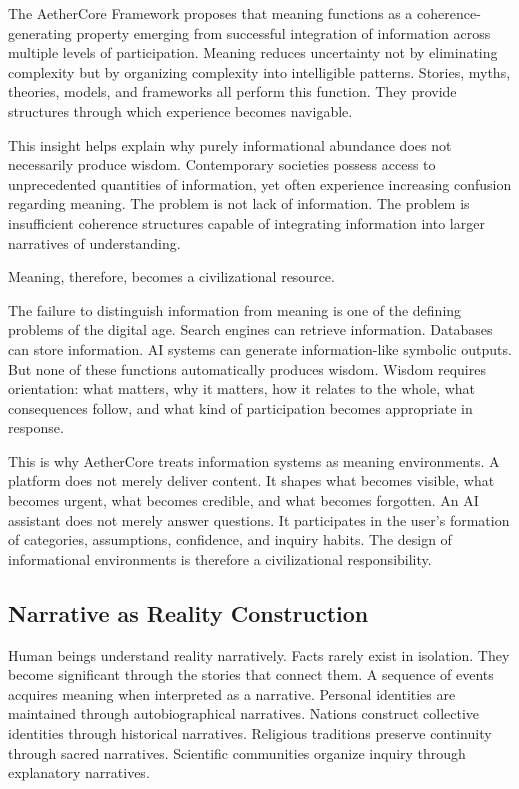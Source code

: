 \documentclass[12pt]{article}
\begin{document}
The AetherCore Framework proposes that meaning functions as a coherence-generating property emerging from successful integration of information across multiple levels of participation. Meaning reduces uncertainty not by eliminating complexity but by organizing complexity into intelligible patterns. Stories, myths, theories, models, and frameworks all perform this function. They provide structures through which experience becomes navigable.

This insight helps explain why purely informational abundance does not necessarily produce wisdom. Contemporary societies possess access to unprecedented quantities of information, yet often experience increasing confusion regarding meaning. The problem is not lack of information. The problem is insufficient coherence structures capable of integrating information into larger narratives of understanding.

Meaning, therefore, becomes a civilizational resource.

The failure to distinguish information from meaning is one of the defining problems of the digital age. Search engines can retrieve information. Databases can store information. AI systems can generate information-like symbolic outputs. But none of these functions automatically produces wisdom. Wisdom requires orientation: what matters, why it matters, how it relates to the whole, what consequences follow, and what kind of participation becomes appropriate in response.

This is why AetherCore treats information systems as meaning environments. A platform does not merely deliver content. It shapes what becomes visible, what becomes urgent, what becomes credible, and what becomes forgotten. An AI assistant does not merely answer questions. It participates in the user's formation of categories, assumptions, confidence, and inquiry habits. The design of informational environments is therefore a civilizational responsibility.

\subsection{Narrative as Reality Construction}

Human beings understand reality narratively. Facts rarely exist in isolation. They become significant through the stories that connect them. A sequence of events acquires meaning when interpreted as a narrative. Personal identities are maintained through autobiographical narratives. Nations construct collective identities through historical narratives. Religious traditions preserve continuity through sacred narratives. Scientific communities organize inquiry through explanatory narratives.
\end{document}
